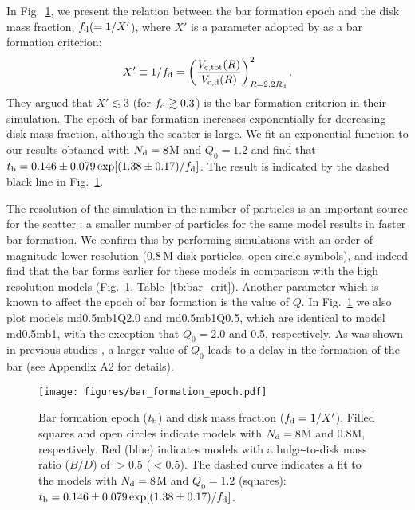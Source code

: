In Fig.~\ref{fig:bfe}, we present the relation
between the bar formation epoch and the disk mass fraction, $f_{\rm d}(=1/X'$),
where $X'$ is a parameter adopted by \citet{2008ApJ...679.1239W} as 
a bar formation criterion:
\begin{eqnarray}
 X'\equiv 1/f_{\rm d} = \left( \frac{V_{\rm c, tot}(R)}{V_{\rm c, d}(R)} \right)^2_{R=2.2R_{\rm d}}.
\label{eq:Xprime}
\end{eqnarray}
They argued that $X'\lesssim 3$ (for $f_{\rm d}\gtrsim 0.3$) is the
bar formation criterion in their simulation.  The epoch of bar
formation increases exponentially for decreasing disk mass-fraction,
although the scatter is large.  We fit an exponential function to our
results obtained with $N_{\rm d}=8$M and $Q_0=1.2$ and find that
$t_{\rm b}=0.146\pm 0.079 \exp [(1.38\pm 0.17)/f_{\rm d}]$.  The result
is indicated by the dashed black line in Fig.~\ref{fig:bfe}.

The resolution of the simulation in the number of particles is an important source for the scatter
 \citep{2009ApJ...697..293D}; 
a smaller number of particles for the same model results in faster bar formation.
We confirm this by performing simulations with an order of magnitude lower
resolution (0.8\,M disk particles, open circle symbols), and indeed find that the bar forms
earlier for these models in comparison with the high resolution models (Fig.~\ref{fig:bfe}, Table~\ref{tb:bar_crit}). 
Another parameter which is known to affect the epoch of bar formation is the value of $Q$.
In Fig.~\ref{fig:bfe} we also plot models md0.5mb1Q2.0 and md0.5mb1Q0.5, 
which are identical to model md0.5mb1, with the exception that $Q_0=2.0$ and 0.5, respectively.
As was shown in previous studies \citep[c.f.,][]{1986MNRAS.221..213A}, 
a larger value of $Q_0$ leads to a delay in the formation of the bar 
(see Appendix A2 for details).




\begin{figure}
\texttt{[image: figures/bar\_formation\_epoch.pdf]}
\caption{Bar formation epoch ($t_{\rm b}$) and disk mass fraction 
($f_{\rm d}=1/X'$). 
Filled squares and open circles indicate models with $N_{\rm d}=8$M and 0.8M, respectively. 
Red (blue) indicates models with a bulge-to-disk mass ratio ($B/D$) of 
$>0.5$ ($<0.5$).
The dashed curve indicates a fit to the models with $N_{\rm d}=8$M and $Q_0=1.2$
(squares): $t_{\rm b}=0.146\pm 0.079 \exp [(1.38\pm 0.17)/f_{\rm d}]$.
\label{fig:bfe}}
\end{figure}




